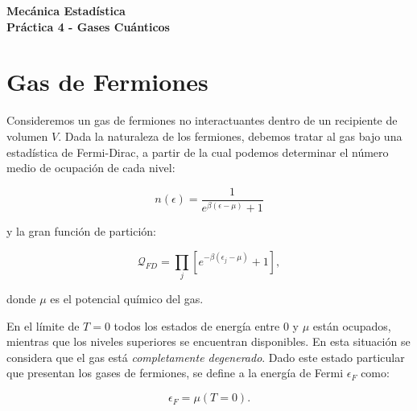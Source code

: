 \documentclass[a4paper,11pt]{article}
\begin{document}
\pagestyle{fancy}
\chead{\small \the\year}



\thispagestyle{plain}
\begin{center}
    \textbf{\large
        Mecánica Estadística \\
        Práctica 4 - Gases Cuánticos
    }
\end{center}
\vspace{-1.5em}




\section{Gas de Fermiones}

Consideremos un gas de fermiones no interactuantes dentro de un 
recipiente de volumen $V$.
Dada la naturaleza de los fermiones, debemos tratar al gas bajo una 
estadística de Fermi-Dirac, a partir de la cual podemos determinar el 
número medio de ocupación de cada nivel:

$$ n(\epsilon) = \frac{1}{e^{\beta(\epsilon - \mu)} + 1} $$

\noindent y la gran función de partición:

$$
\mathcal{Q}_{FD} =
  \prod_j \left[ e^{-\beta(\epsilon_j - \mu)} + 1\right],
$$

\noindent donde $\mu$ es el potencial químico del gas.

En el límite de $T = 0$ todos los estados de energía entre 0 y $\mu$ 
están ocupados, mientras que los niveles superiores se encuentran 
disponibles.
En esta situación se considera que el gas está \emph{completamente 
degenerado}.
Dado este estado particular que presentan los gases de fermiones, se 
define a la energía de Fermi $\epsilon_F$ como:

$$ \epsilon_F = \mu(T=0). $$
\end{document}
